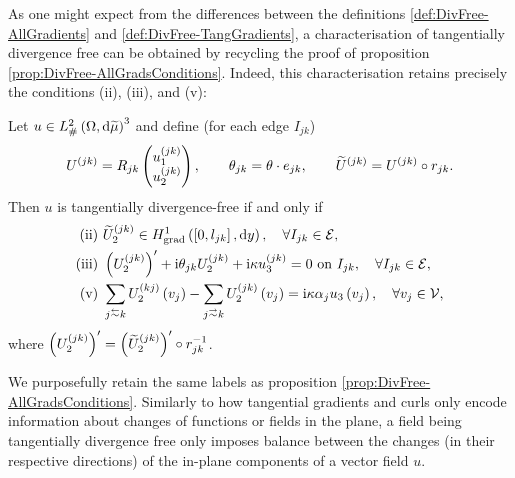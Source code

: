 As one might expect from the differences between the definitions \ref{def:DivFree-AllGradients} and \ref{def:DivFree-TangGradients}, a characterisation of tangentially divergence free can be obtained by recycling the proof of proposition \ref{prop:DivFree-AllGradsConditions}.
Indeed, this characterisation retains precisely the conditions (ii), (iii), and (v):
\begin{cory} \label{cory:DivFree-TangGradsConditions}
	Let $u\in L^2_{\#}\left( \Omega,\mathrm{d} \widetilde{\mu} \right)^3$ and define (for each edge $I_{jk}$)
	\begin{align*}
		U^{(jk)} = R_{jk}\begin{pmatrix} u_1^{(jk)} \\ u_2^{(jk)} \end{pmatrix}, 
		\qquad \theta_{jk} = \theta\cdot e_{jk}, 
		\qquad \widetilde{U}^{(jk)} = U^{(jk)}\circ r_{jk}.
	\end{align*}		
	Then $u$ is tangentially divergence-free if and only if
	\begin{align*}
		\mathrm{(ii)} \ & \widetilde{U}_2^{(jk)}\in\gradSob{\sqbracs{0,l_{jk}}}{y}, \quad \forall I_{jk}\in\edgeSet, \\
		\mathrm{(iii)} \ & \bracs{U_2^{(jk)}}' + \rmi\qm_{jk}U_2^{(jk)} + \rmi\wavenumber u_3^{(jk)} = 0 \text{ on } I_{jk}, \quad \forall I_{jk}\in\edgeSet, \\
		\mathrm{(v)} \ & \sum_{j\conRight k}U_2^{(kj)}\bracs{v_j} - \sum_{j\conLeft k}U_2^{(jk)}\bracs{v_j} = \rmi\wavenumber\alpha_j u_3\bracs{v_j}, \quad \forall v_j\in\vertSet,
	\end{align*}
	where $\left( U_2^{(jk)} \right)' = \left( \widetilde{U}_2^{(jk)} \right)'\circ r_{jk}^{-1}$.
\end{cory}
We purposefully retain the same labels as proposition \ref{prop:DivFree-AllGradsConditions}.
Similarly to how tangential gradients and curls only encode information about changes of functions or fields in the plane, a field being tangentially divergence free only imposes balance between the changes (in their respective directions) of the in-plane components of a vector field $u$.

